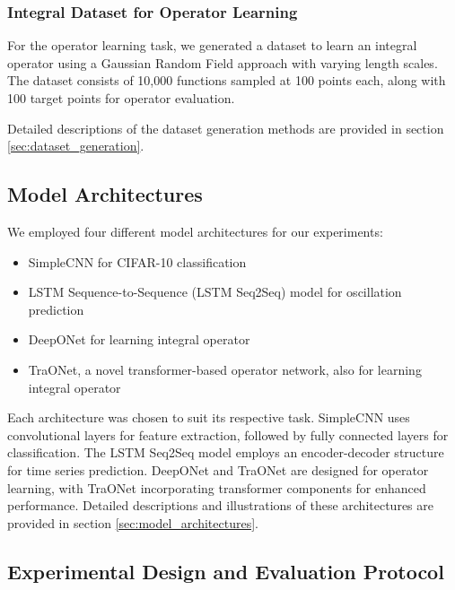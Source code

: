 \documentclass{article}
\theoremstyle{plain}
\theoremstyle{definition}
\theoremstyle{remark}
\begin{document}
\subsubsection{Integral Dataset for Operator Learning}
\label{subsubsec:integral}

For the operator learning task, we generated a dataset to learn an integral operator using a Gaussian Random Field approach with varying length scales.
The dataset consists of 10,000 functions sampled at 100 points each, along with 100 target points for operator evaluation.

Detailed descriptions of the dataset generation methods are provided in section \ref{sec:dataset_generation}.

\subsection{Model Architectures}
\label{subsec:models}

We employed four different model architectures for our experiments:

\begin{itemize}
   \item SimpleCNN for CIFAR-10 classification
   \item LSTM Sequence-to-Sequence (LSTM Seq2Seq) model \cite{sutskever2014sequence} for oscillation prediction
   \item DeepONet \cite{lu2021learning} for learning integral operator
   \item TraONet, a novel transformer-based operator network, also for learning integral operator
\end{itemize}

Each architecture was chosen to suit its respective task.
SimpleCNN uses convolutional layers \cite{krizhevsky2012imagenet} for feature extraction, followed by fully connected layers for classification.
The LSTM Seq2Seq model employs an encoder-decoder structure for time series prediction.
DeepONet and TraONet are designed for operator learning, with TraONet incorporating transformer \cite{vaswani2017attention} components for enhanced performance.
Detailed descriptions and illustrations of these architectures are provided in section \ref{sec:model_architectures}.

\subsection{Experimental Design and Evaluation Protocol}
\label{subsec:exp_design}
\end{document}

